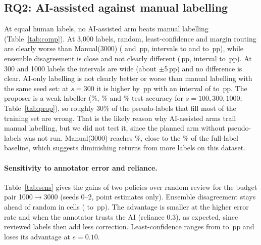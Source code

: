 \documentclass[11pt]{article}
\newcommand{\pp}{\,pp}
\begin{document}
\subsection{RQ2: AI-assisted against manual labelling}
At equal human labels, no AI-assisted arm beats manual labelling (Table~\ref{tab:comp}). At 3{,}000 labels, random, least-confidence and margin routing are clearly worse than Manual(3000) (\RandVsManMean{} and \LcVsManMean\pp{}, intervals \RandVsManLo{} to \RandVsManHi{} and \LcVsManLo{} to \LcVsManHi\pp), while ensemble disagreement is close and not clearly different (\EnsVsManMean\pp, interval \EnsVsManLo{} to \EnsVsManHi\pp). At 300 and 1000 labels the intervals are wide (about $\pm$5\pp) and no difference is clear. AI-only labelling is not clearly better or worse than manual labelling with the same seed set: at $s=300$ it is higher by \OnlyVsManMean\pp{} with an interval of \OnlyVsManLo{} to \OnlyVsManHi\pp. The proposer is a weak labeller (\ProposerAccOneH\%, \ProposerAccThreeH\% and \ProposerAccOneK\% test accuracy for $s=100,300,1000$; Table~\ref{tab:prop}), so roughly 30\% of the pseudo-labels that fill most of the training set are wrong. That is the likely reason why AI-assisted arms trail manual labelling, but we did not test it, since the planned arm without pseudo-labels was not run. Manual($3000$) reaches \ManThreeK\%, close to the \DnaEnh\% of the full-label baseline, which suggests diminishing returns from more labels on this dataset.

\begin{table}[t]
\centering\small

\caption{Quality of the proposer and of its pseudo-labels in the main cell (mean over seeds).}\label{tab:prop}
\end{table}

\paragraph{Sensitivity to annotator error and reliance.} Table~\ref{tab:sens} gives the gains of two policies over random review for the budget pair 1000$\to$3000 (seeds 0--2, point estimates only). Ensemble disagreement stays ahead of random in \SensEnsAllPos{} cells (\SensEnsMin{} to \SensEnsMax\pp). The advantage is smaller at the higher error rate and when the annotator trusts the AI (reliance 0.3), as expected, since reviewed labels then add less correction. Least-confidence ranges from \SensLcMin{} to \SensLcMax\pp{} and loses its advantage at $e=0.10$.
\begin{table}[t]
\centering\small

\caption{Gain over random review, budget pair 1000$\to$3000, seeds 0--2 (point estimates, no intervals).}\label{tab:sens}
\end{table}
\end{document}
